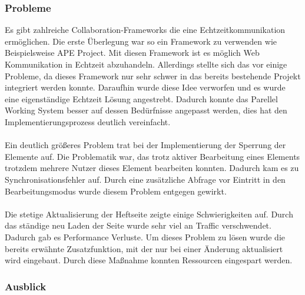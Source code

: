 \subsubsection{Probleme}
Es gibt zahlreiche Collaboration-Frameworks die eine Echtzeitkommunikation ermöglichen. Die erste Überlegung war so ein Framework zu verwenden wie Beispielsweise APE Project\cite{APE}. Mit diesen Framework ist es möglich Web Kommunikation in Echtzeit abzuhandeln. Allerdings stellte sich das vor einige Probleme, da dieses Framework nur sehr schwer in das bereits bestehende Projekt integriert werden konnte. Daraufhin wurde diese Idee verworfen und es wurde eine eigenständige Echtzeit Lösung angestrebt. Dadurch konnte das Parellel Working System besser auf dessen Bedürfnisse angepasst werden, dies hat den Implementierungsprozess deutlich vereinfacht. \\
\\
Ein deutlich größeres Problem trat bei der Implementierung der Sperrung der Elemente auf. Die Problematik war, das trotz aktiver Bearbeitung eines Elements trotzdem mehrere Nutzer dieses Element bearbeiten konnten. Dadurch kam es zu Synchronisationsfehler auf. Durch eine zusätzliche Abfrage vor Eintritt in den Bearbeitungsmodus wurde diesem Problem entgegen gewirkt. \\
\\
Die stetige Aktualisierung der Heftseite zeigte einige Schwierigkeiten auf. Durch das ständige neu Laden der Seite wurde sehr viel an Traffic verschwendet. Dadurch gab es Performance Verluste. Um dieses Problem zu lösen wurde die bereits erwähnte Zusatzfunktion, mit der nur bei einer Änderung aktualisiert wird eingebaut. Durch diese Maßnahme konnten Ressourcen eingespart werden. 
\subsubsection{Ausblick}


